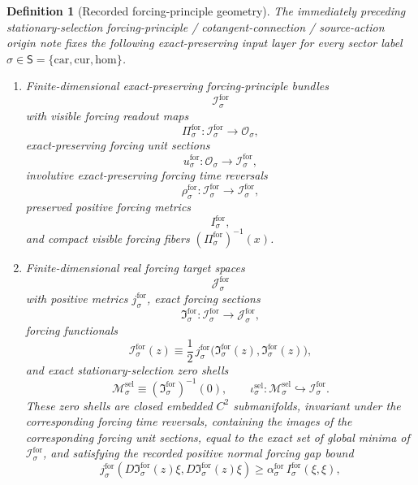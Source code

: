 \documentclass[11pt]{article}
\newcommand{\SectorSet}{\mathsf S}
\newcommand{\Car}{\mathrm{car}}
\newcommand{\Cur}{\mathrm{cur}}
\newcommand{\Hom}{\mathrm{hom}}
\newcommand{\ObjClass}[1]{\mathcal O_{#1}}
\newcommand{\SelSpace}[1]{\mathcal M_{#1}^{\mathrm{sel}}}
\newcommand{\SelInc}[1]{\iota_{#1}^{\mathrm{sel}}}
\newcommand{\ForSpace}[1]{\mathcal I_{#1}^{\mathrm{for}}}
\newcommand{\ForRead}[1]{\Pi_{#1}^{\mathrm{for}}}
\newcommand{\ForUnit}[1]{u_{#1}^{\mathrm{for}}}
\newcommand{\ForTimeRev}[1]{\rho_{#1}^{\mathrm{for}}}
\newcommand{\ForMetric}[1]{I_{#1}^{\mathrm{for}}}
\newcommand{\ForTarget}[1]{\mathcal J_{#1}^{\mathrm{for}}}
\newcommand{\ForTargetMetric}[1]{j_{#1}^{\mathrm{for}}}
\newcommand{\ForGap}[1]{\alpha_{#1}^{\mathrm{for}}}
\newcommand{\ForSection}[1]{\mathfrak I_{#1}^{\mathrm{for}}}
\newcommand{\ForFunctional}[1]{\mathscr I_{#1}^{\mathrm{for}}}
\newtheorem{definition}{Definition}
\begin{document}
\begin{definition}[Recorded forcing-principle geometry]
\label{def:recorded_forcing_geometry}
The immediately preceding stationary-selection forcing-principle / cotangent-connection / source-action origin note fixes the following exact-preserving input layer for every sector label \(\sigma\in\SectorSet=\{\Car,\Cur,\Hom\}\).
\begin{enumerate}
    \item Finite-dimensional exact-preserving forcing-principle bundles
    \[
    \ForSpace{\sigma}
    \]
    with visible forcing readout maps
    \[
    \ForRead{\sigma}:\ForSpace{\sigma}\to\ObjClass{\sigma},
    \]
    exact-preserving forcing unit sections
    \[
    \ForUnit{\sigma}:\ObjClass{\sigma}\to\ForSpace{\sigma},
    \]
    involutive exact-preserving forcing time reversals
    \[
    \ForTimeRev{\sigma}:\ForSpace{\sigma}\to\ForSpace{\sigma},
    \]
    preserved positive forcing metrics
    \[
    \ForMetric{\sigma},
    \]
    and compact visible forcing fibers \((\ForRead{\sigma})^{-1}(x)\).
    \item Finite-dimensional real forcing target spaces
    \[
    \ForTarget{\sigma}
    \]
    with positive metrics \(\ForTargetMetric{\sigma}\), exact forcing sections
    \[
    \ForSection{\sigma}:\ForSpace{\sigma}\to\ForTarget{\sigma},
    \]
    forcing functionals
    \begin{equation}
    \ForFunctional{\sigma}(z)\equiv \frac12\,
    \ForTargetMetric{\sigma}\bigl(\ForSection{\sigma}(z),\ForSection{\sigma}(z)\bigr),
    \label{eq:recorded_forcing_functional}
    \end{equation}
    and exact stationary-selection zero shells
    \begin{equation}
    \SelSpace{\sigma}\equiv \left(\ForSection{\sigma}\right)^{-1}(0),
    \qquad
    \SelInc{\sigma}:\SelSpace{\sigma}\hookrightarrow \ForSpace{\sigma}.
    \label{eq:recorded_forcing_shell}
    \end{equation}
    These zero shells are closed embedded \(C^2\) submanifolds, invariant under the corresponding forcing time reversals, containing the images of the corresponding forcing unit sections, equal to the exact set of global minima of \(\ForFunctional{\sigma}\), and satisfying the recorded positive normal forcing gap bound
    \begin{equation}
    \ForTargetMetric{\sigma}\!\left(
    D\ForSection{\sigma}(z)\xi,
    D\ForSection{\sigma}(z)\xi
    \right)
    \ge
    \ForGap{\sigma}\,
    \ForMetric{\sigma}(\xi,\xi),

\end{equation}
\end{enumerate}
\end{definition}
\end{document}
